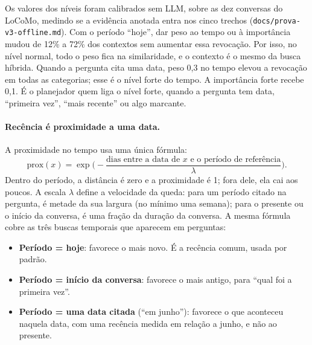 \documentclass[11pt]{article}
\begin{document}
Os valores dos níveis foram calibrados sem LLM, sobre as dez conversas do
LoCoMo, medindo se a evidência anotada entra nos cinco trechos
(\texttt{docs/prova-v3-offline.md}). Com o período ``hoje'', dar peso ao
tempo ou à importância mudou de 12\% a 72\% dos contextos sem aumentar essa
revocação. Por isso, no nível normal, todo o peso fica na similaridade, e o
contexto é o mesmo da busca híbrida. Quando a pergunta cita uma data, peso
0,3 no tempo elevou a revocação em todas as categorias; esse é o nível forte
do tempo. A importância forte recebe 0,1. É o planejador quem liga o nível
forte, quando a pergunta tem data, ``primeira vez'', ``mais recente'' ou algo
marcante.

\paragraph{Recência é proximidade a uma data.} A proximidade no tempo usa uma
única fórmula:
\begin{equation}
\label{eq:prox}
\text{prox}(x)=\exp\!\Big(-\frac{\text{dias entre a data de } x \text{ e o período de referência}}{\lambda}\Big).
\end{equation}
Dentro do período, a distância é zero e a proximidade é 1; fora dele, ela
cai aos poucos. A escala $\lambda$ define a velocidade da queda: para um
período citado na pergunta, é metade da sua largura (no mínimo uma semana);
para o presente ou o início da conversa, é uma fração da duração da conversa.
A mesma fórmula cobre as três buscas temporais que aparecem em perguntas:
\begin{itemize}[leftmargin=*,itemsep=1pt]
\item \textbf{Período = hoje}: favorece o mais novo. É a recência comum,
  usada por padrão.
\item \textbf{Período = início da conversa}: favorece o mais antigo, para
  ``qual foi a primeira vez''.
\item \textbf{Período = uma data citada} (``em junho''): favorece o que
  aconteceu naquela data, com uma recência medida em relação a junho, e não
  ao presente.
\end{itemize}
\end{document}
